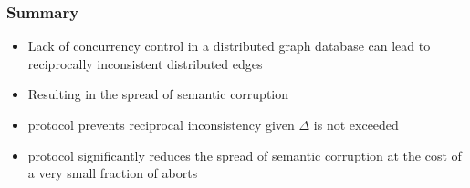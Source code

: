 \begin{frame}
  \frametitle{Summary}
  \begin{itemize}
  \item Lack of concurrency control in a distributed graph database can lead to reciprocally inconsistent distributed edges
    \item Resulting in the spread of semantic corruption
  \item \tDelta protocol prevents reciprocal inconsistency given $\Delta$ is not exceeded
  \item \tDelta protocol significantly reduces the spread of semantic corruption at the cost of a very small fraction of aborts
  \end{itemize}
\end{frame}